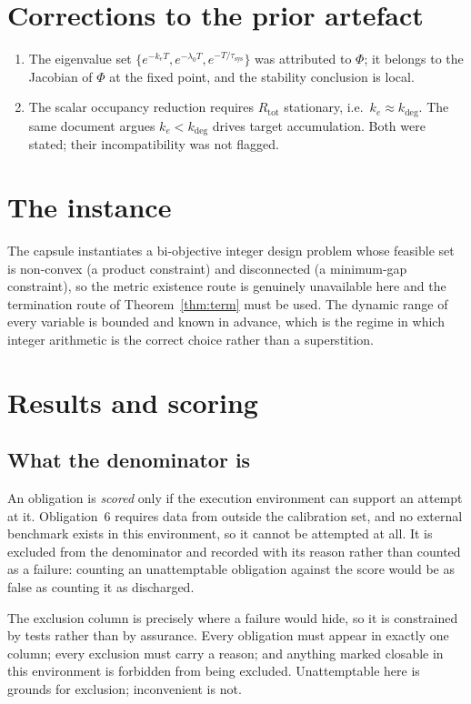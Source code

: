 \documentclass[11pt,a4paper]{article}
\theoremstyle{plain}
\theoremstyle{definition}
\theoremstyle{remark}
\begin{document}
\section{Corrections to the prior artefact}
\begin{enumerate}[leftmargin=2em]
\item The eigenvalue set
$\{e^{-k_eT},e^{-\lambda_0T},e^{-T/\tau_{\mathrm{sys}}}\}$ was attributed to
$\Phi$; it belongs to the Jacobian of $\Phi$ at the fixed point, and the
stability conclusion is local.
\item The scalar occupancy reduction requires $R_{\mathrm{tot}}$ stationary,
i.e.\ $k_e\approx k_{\deg}$. The same document argues $k_e<k_{\deg}$ drives
target accumulation. Both were stated; their incompatibility was not flagged.
\end{enumerate}

\section{The instance}
The capsule instantiates a bi-objective integer design problem whose feasible
set is non-convex (a product constraint) and disconnected (a minimum-gap
constraint), so the metric existence route is genuinely unavailable here and
the termination route of Theorem~\ref{thm:term} must be used. The dynamic
range of every variable is bounded and known in advance, which is the regime
in which integer arithmetic is the correct choice rather than a superstition.

\section{Results and scoring}\label{sec:results}

\subsection{What the denominator is}
An obligation is \emph{scored} only if the execution environment can support an
attempt at it. Obligation~6 requires data from outside the calibration set, and
no external benchmark exists in this environment, so it cannot be attempted at
all. It is excluded from the denominator and recorded with its reason rather
than counted as a failure: counting an unattemptable obligation against the
score would be as false as counting it as discharged.

The exclusion column is precisely where a failure would hide, so it is
constrained by tests rather than by assurance. Every obligation must appear in
exactly one column; every exclusion must carry a reason; and anything marked
closable in this environment is forbidden from being excluded. Unattemptable
here is grounds for exclusion; inconvenient is not.
\end{document}
